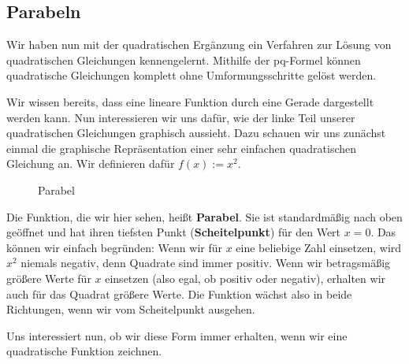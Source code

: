\documentclass[../../main.tex]{subfiles}
\begin{document}
\subsection{Parabeln}
Wir haben nun mit der quadratischen Ergänzung ein Verfahren zur Lösung von quadratischen Gleichungen kennengelernt. Mithilfe der pq-Formel können quadratische Gleichungen komplett ohne Umformungsschritte gelöst werden.

\noindent Wir wissen bereits, dass eine lineare Funktion durch eine Gerade dargestellt werden kann. Nun interessieren wir uns dafür, wie der linke Teil unserer quadratischen Gleichungen graphisch aussieht. Dazu schauen wir uns zunächst einmal die graphische Repräsentation einer sehr einfachen quadratischen Gleichung an. Wir definieren dafür $f(x):=x^2$.
\begin{figure}[htb]
    \centering
    \caption{Parabel}
    \label{fig:my_label}
\end{figure}

\noindent Die Funktion, die wir hier sehen, heißt \textbf{Parabel}. Sie ist standardmäßig nach oben geöffnet und hat ihren tiefsten Punkt (\textbf{Scheitelpunkt}) für den Wert $x=0$. Das können wir einfach begründen: Wenn wir für $x$ eine beliebige Zahl einsetzen, wird $x^2$ niemals negativ, denn Quadrate sind immer positiv. Wenn wir betragsmäßig größere Werte für $x$ einsetzen (also egal, ob positiv oder negativ), erhalten wir auch für das Quadrat größere Werte. Die Funktion wächst also in beide Richtungen, wenn wir vom Scheitelpunkt ausgehen.

Uns interessiert nun, ob wir diese Form immer erhalten, wenn wir eine quadratische Funktion zeichnen.
\end{document}

